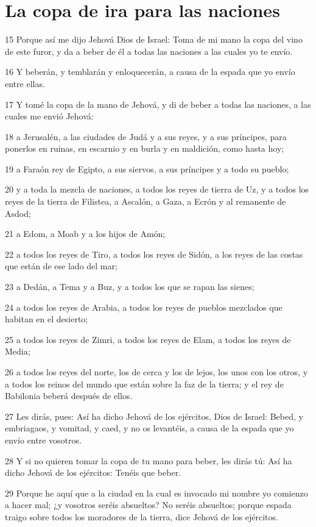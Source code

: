 \section*{La copa de ira para las naciones}

\par 15 Porque así me dijo Jehová Dios de Israel: Toma de mi mano la copa del vino de este furor, y da a beber de él a todas las naciones a las cuales yo te envío.
\par 16 Y beberán, y temblarán y enloquecerán, a causa de la espada que yo envío entre ellas.
\par 17 Y tomé la copa de la mano de Jehová, y di de beber a todas las naciones, a las cuales me envió Jehová:
\par 18 a Jerusalén, a las ciudades de Judá y a sus reyes, y a sus príncipes, para ponerlos en ruinas, en escarnio y en burla y en maldición, como hasta hoy;
\par 19 a Faraón rey de Egipto, a sus siervos, a sus príncipes y a todo su pueblo;
\par 20 y a toda la mezcla de naciones, a todos los reyes de tierra de Uz, y a todos los reyes de la tierra de Filistea, a Ascalón, a Gaza, a Ecrón y al remanente de Asdod;
\par 21 a Edom, a Moab y a los hijos de Amón;
\par 22 a todos los reyes de Tiro, a todos los reyes de Sidón, a los reyes de las costas que están de ese lado del mar;
\par 23 a Dedán, a Tema y a Buz, y a todos los que se rapan las sienes;
\par 24 a todos los reyes de Arabia, a todos los reyes de pueblos mezclados que habitan en el desierto;
\par 25 a todos los reyes de Zimri, a todos los reyes de Elam, a todos los reyes de Media;
\par 26 a todos los reyes del norte, los de cerca y los de lejos, los unos con los otros, y a todos los reinos del mundo que están sobre la faz de la tierra; y el rey de Babilonia beberá después de ellos.
\par 27 Les dirás, pues: Así ha dicho Jehová de los ejércitos, Dios de Israel: Bebed, y embriagaos, y vomitad, y caed, y no os levantéis, a causa de la espada que yo envío entre vosotros.
\par 28 Y si no quieren tomar la copa de tu mano para beber, les dirás tú: Así ha dicho Jehová de los ejércitos: Tenéis que beber.
\par 29 Porque he aquí que a la ciudad en la cual es invocado mi nombre yo comienzo a hacer mal; ¿y vosotros seréis absueltos? No seréis absueltos; porque espada traigo sobre todos los moradores de la tierra, dice Jehová de los ejércitos.
